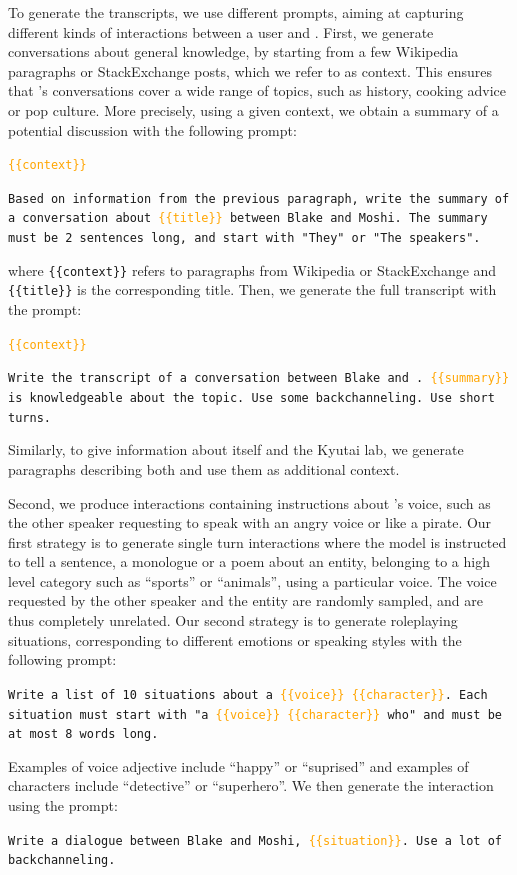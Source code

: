 To generate the transcripts, we use different prompts, aiming at capturing different kinds of interactions between a user and \ours{}.
First, we generate conversations about general knowledge, by starting from a few Wikipedia paragraphs or StackExchange posts, which we refer to as context.
This ensures that \ours{}'s conversations cover a wide range of topics, such as history, cooking advice or pop culture.
More precisely, using a given context, we obtain a summary of a potential discussion with the following prompt:
\begin{tcolorbox}
  \texttt{\textcolor{orange}{\{\{context\}\}}}
  
  \vspace{1em}
  \texttt{Based on information from the previous paragraph, write the summary of a conversation about \textcolor{orange}{\{\{title\}\}} between Blake and Moshi. The summary must be 2 sentences long, and start with "They" or "The speakers".}
\end{tcolorbox}

\noindent where \texttt{\{\{context\}\}} refers to paragraphs from Wikipedia or StackExchange and \texttt{\{\{title\}\}} is the corresponding title.
Then, we generate the full transcript with the prompt:
\begin{tcolorbox}
  \texttt{\textcolor{orange}{\{\{context\}\}}}

  \vspace{1em}
  \texttt{Write the transcript of a conversation between Blake and  \ours{}. \textcolor{orange}{\{\{summary\}\}} \ours{} is knowledgeable about the topic. Use some backchanneling. Use short turns.}
\end{tcolorbox}
Similarly, to give \ours{} information about itself and the Kyutai lab, we generate paragraphs describing both and use them as additional context.

Second, we produce interactions containing instructions about  \ours{}'s voice, such as the other speaker requesting \ours{} to speak with an angry voice or like a pirate.
Our first strategy is to generate single turn interactions where the model is instructed to tell a sentence, a monologue or a poem about an entity, belonging to a high level category such as “sports” or “animals”, using a particular voice.
The voice requested by the other speaker and the entity are randomly sampled, and are thus completely unrelated.
Our second strategy is to generate roleplaying situations, corresponding to different emotions or speaking styles with the following prompt:
\begin{tcolorbox}
  \texttt{Write a list of 10 situations about a \textcolor{orange}{\{\{voice\}\} \{\{character\}\}}. Each situation must start with "a \textcolor{orange}{\{\{voice\}\} \{\{character\}\}} who" and must be at most 8 words long.}
\end{tcolorbox}
Examples of voice adjective include ``happy'' or ``suprised'' and examples of characters include ``detective'' or ``superhero''.
We then generate the interaction using the prompt:
\begin{tcolorbox}
\texttt{Write a dialogue between Blake and Moshi, \textcolor{orange}{\{\{situation\}\}}. Use a lot of backchanneling.}
\end{tcolorbox}

